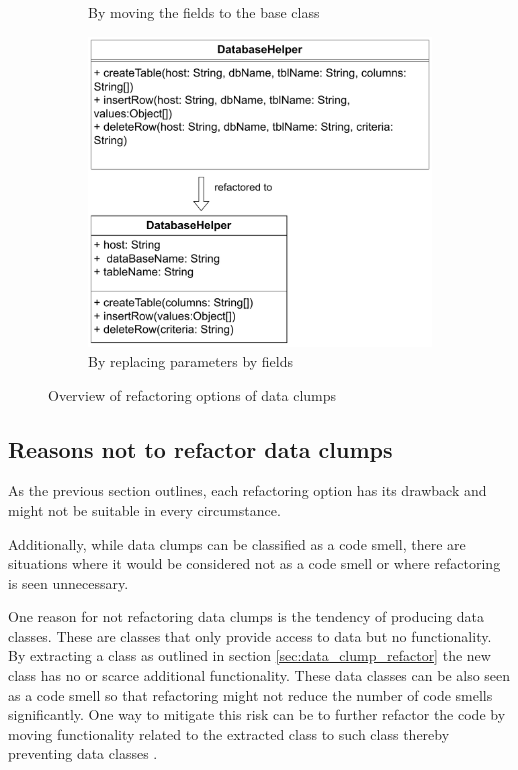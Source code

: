 \begin{figure}
\begin{subfigure}[t]{0.4\columnwidth}
        \caption{By moving the fields to the base class}
        \label{fig:move_fields_up}
    \end{subfigure}
     \begin{subfigure}[t]{0.59\columnwidth}
\includegraphics[width=1\columnwidth]{figures/chapter2/alternative_refactorings_to_fields.drawio.pdf}
\caption{By replacing parameters by fields}
\label{fig:params_to_fields}


    \end{subfigure}
\label{fig:refactoring_options}
\caption{Overview of refactoring options of data clumps}
\end{figure}


\subsection{Reasons not to refactor data clumps}\label{sec:data_clump_not_refactor}
As the previous section  outlines, each refactoring option has its drawback and might not be suitable in every circumstance.

Additionally, while data clumps can be classified as a code smell, there are situations where it would be considered not as a code smell or where refactoring is seen unnecessary. 

One reason for not refactoring data clumps is the tendency of producing data classes. These are classes that only provide access to data but no functionality. By extracting a class as outlined in section \ref{sec:data_clump_refactor} the new class has no or scarce additional functionality. These data classes can be also seen as a code smell so that refactoring might not reduce the number of code smells significantly. One way to mitigate this risk can be to further refactor the code by moving functionality related to the extracted class to such class thereby preventing data classes \cite{fowler2019refactoring}. 

